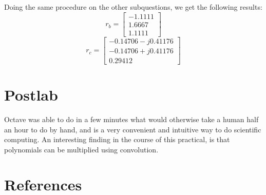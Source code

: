 \documentclass[12pt, a4paper]{article}
\begin{document}
			Doing the same procedure on the other subquestions, we get the following results:
			\[
				r_b =
				\begin{bmatrix}
					-1.1111 \\
					1.6667 \\
					1.1111
				\end{bmatrix}
			\]
			\[
				r_c =
				\begin{bmatrix}
					-0.14706 - j0.41176 \\
					-0.14706 + j0.41176 \\
					0.29412
				\end{bmatrix}
			\]


	\section{Postlab} %
	\label{sec:postlab}
		Octave was able to do in a few minutes what would otherwise take a human half an hour to do by hand, and is a very convenient and intuitive way to do scientific computing. An interesting finding in the course of this practical, is that polynomials can be multiplied using convolution.

	\section{References} %
	\label{sec:references}
		
\end{document}
